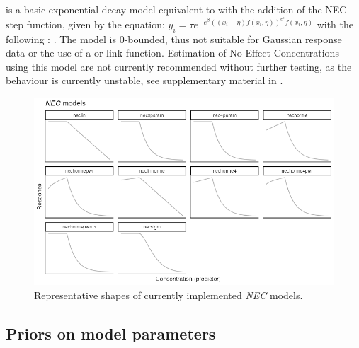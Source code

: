 \documentclass[
  shortnames]{jss}
\begin{document}
 is a basic exponential decay model equivalent to  with the addition of the NEC step function, given by the equation:
\(y_i = \tau e^{-e^{\beta} ((x_i - \eta) f(x_i, \eta))^{e^\epsilon} f(x_i, \eta)}\)
with the following : . The model is 0-bounded, thus not suitable for Gaussian response data or the use of a  or  link function. Estimation of No-Effect-Concentrations using this model are not currently recommended without further testing, as the behaviour is currently unstable, see supplementary material in \citet{fisher2023ieam}.

\begin{figure}[ht]
  \centering
  \includegraphics[width=1\textwidth]{../vignettes/vignette-fig-exmp2b-theoretical_nec_curves.png}
  \caption{Representative shapes of currently implemented  \textit{NEC} models.}
  \label{fig2}
\end{figure}

\hypertarget{priors-on-model-parameters}{%
\subsection{Priors on model parameters}\label{priors-on-model-parameters}}
\end{document}
